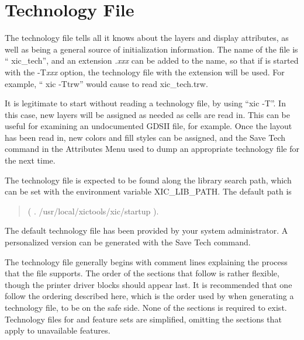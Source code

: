 
\appendix
\chapter{Technology File}
\label{techfile}
The technology file tells {\Xic} all it knows about the layers and
display attributes, as well as being a general source of
initialization information.  The name of the file is ``{\vt
xic\_tech}'', and an extension {\it .xxx\/} can be added to the name,
so that if {\Xic} is started with the {\vt -T}{\it xxx\/} option, the
technology file with the extension will be used.  For example, ``{\vt
xic -Ttrw}'' would cause {\Xic} to read {\vt xic\_tech.trw}.

It is legitimate to start {\Xic} without reading a technology file, by
using ``{\vt xic -T}''.  In this case, new layers will be assigned as
needed as cells are read in.  This can be useful for examining an
undocumented GDSII file, for example.  Once the layout has been read
in, new colors and fill styles can be assigned, and the {\cb Save
Tech} command in the {\cb Attributes Menu} used to dump an appropriate
technology file for the next time.

The technology file is expected to be found along the library search
path, which can be set with the environment variable {\et
XIC\_LIB\_PATH}.  The default path is
\begin{quote}
 {\vt ( . /usr/local/xictools/xic/startup )}.
\end{quote}
The default technology file has been provided by your system
administrator.  A personalized version can be generated with the {\cb
Save Tech} command.

The technology file generally begins with comment lines explaining the
process that the file supports.  The order of the sections that follow
is rather flexible, though the printer driver blocks should appear
last.  It is recommended that one follow the ordering described here,
which is the order used by {\Xic} when generating a technology file,
to be on the safe side.  None of the sections is required to exist. 
Technology files for {\XicII} and {\Xiv} feature sets are simplified,
omitting the sections that apply to unavailable features.

